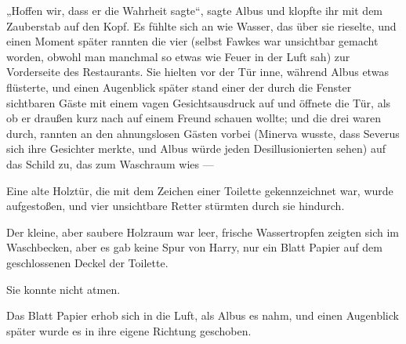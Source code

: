 „Hoffen wir, dass er die Wahrheit sagte“, sagte Albus und klopfte ihr mit dem Zauberstab auf den Kopf. Es fühlte sich an wie Wasser, das über sie rieselte, und einen Moment später rannten die vier (selbst Fawkes war unsichtbar gemacht worden, obwohl man manchmal so etwas wie Feuer in der Luft sah) zur Vorderseite des Restaurants. Sie hielten vor der Tür inne, während Albus etwas flüsterte, und einen Augenblick später stand einer der durch die Fenster sichtbaren Gäste mit einem vagen Gesichtsausdruck auf und öffnete die Tür, als ob er draußen kurz nach auf einem Freund schauen wollte; und die drei waren durch, rannten an den ahnungslosen Gästen vorbei (Minerva wusste, dass Severus sich ihre Gesichter merkte, und Albus würde jeden Desillusionierten sehen) auf das Schild zu, das zum Waschraum wies —

Eine alte Holztür, die mit dem Zeichen einer Toilette gekennzeichnet war, wurde aufgestoßen, und vier unsichtbare Retter stürmten durch sie hindurch.

Der kleine, aber saubere Holzraum war leer, frische Wassertropfen zeigten sich im Waschbecken, aber es gab keine Spur von Harry, nur ein Blatt Papier auf dem geschlossenen Deckel der Toilette.

Sie konnte nicht atmen.

Das Blatt Papier erhob sich in die Luft, als Albus es nahm, und einen Augenblick später wurde es in ihre eigene Richtung geschoben.


